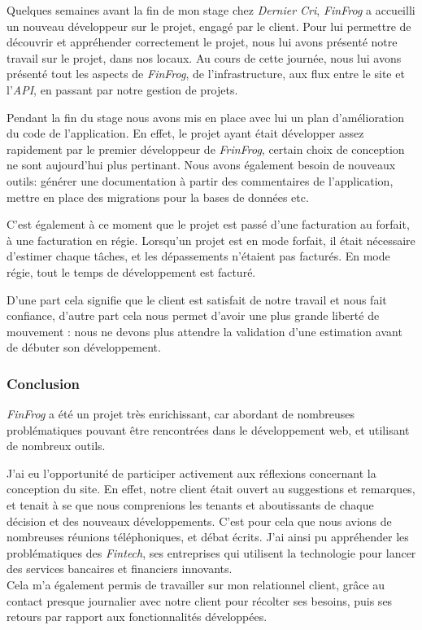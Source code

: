 Quelques semaines avant la fin de mon stage chez \emph{Dernier Cri},
\emph{FinFrog} a accueilli un nouveau développeur sur le projet, engagé
par le client. Pour lui permettre de découvrir et appréhender
correctement le projet, nous lui avons présenté notre travail sur le
projet, dans nos locaux. Au cours de cette journée, nous lui avons
présenté tout les aspects de \emph{FinFrog}, de l'infrastructure, aux
flux entre le site et l'\emph{API}, en passant par notre gestion de
projets.

\bigskip

Pendant la fin du stage nous avons mis en place avec lui un plan
d'amélioration du code de l'application. En effet, le projet ayant était
développer assez rapidement par le premier développeur de
\emph{FrinFrog}, certain choix de conception ne sont aujourd'hui plus
pertinant. Nous avons également besoin de nouveaux outils: générer une
documentation à partir des commentaires de l'application, mettre en
place des migrations pour la bases de données etc.

\bigskip

C'est également à ce moment que le projet est passé d'une facturation au
forfait, à une facturation en régie. Lorsqu'un projet est en mode
forfait, il était nécessaire d'estimer chaque tâches, et les
dépassements n'étaient pas facturés. En mode régie, tout le temps de
développement est facturé.

\bigskip

D'une part cela signifie que le client est satisfait de notre travail et
nous fait confiance, d'autre part cela nous permet d'avoir une plus
grande liberté de mouvement : nous ne devons plus attendre la validation
d'une estimation avant de débuter son développement.

\bigskip

\subsubsection{Conclusion}\label{conclusion-1}

\bigskip

\emph{FinFrog} a été un projet très enrichissant, car abordant de
nombreuses problématiques pouvant être rencontrées dans le développement
web, et utilisant de nombreux outils.

\bigskip

J'ai eu l'opportunité de participer activement aux réflexions concernant
la conception du site. En effet, notre client était ouvert au
suggestions et remarques, et tenait à se que nous comprenions les
tenants et aboutissants de chaque décision et des nouveaux
développements. C'est pour cela que nous avions de nombreuses réunions
téléphoniques, et débat écrits. J'ai ainsi pu appréhender les
problématiques des \emph{Fintech}, ses entreprises qui utilisent la
technologie pour lancer des services bancaires et financiers
innovants.\\
Cela m'a également permis de travailler sur mon relationnel client,
grâce au contact presque journalier avec notre client pour récolter ses
besoins, puis ses retours par rapport aux fonctionnalités développées.


